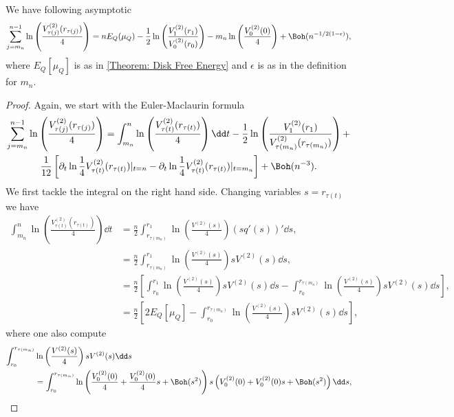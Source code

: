 \begin{proposicao}	\label{Proposition: mn-N lnv disk}
	We have following asymptotic
	\begin{equation}
		\sum_{j=m_n}^{n-1}\ln \left( \frac{V^{(2)}_{\tau(j)}(r_{\tau(j)})}{4}\right) = n E_Q(\mu_Q)  - \frac{1}{2} \ln \left( \frac{V^{(2)}_{1}(r_1)}{V^{(2)}_{0}(r_{0})} \right)  - m_n \ln\left(  \frac{V^{(2)}_0(0)}{4} \right) + \Boh(n^{-1/2(1-\epsilon)}),
	\end{equation}
	where $E_Q[\mu_Q]$ is as in \autoref{Theorem: Disk Free Energy} and $\epsilon$ is as in the definition for $m_n$.
\end{proposicao}
\begin{proof}
	Again, we start with the Euler-Maclaurin formula
		\begin{multline}
		\sum_{j=m_n}^{n-1} \ln \left( \frac{V^{(2)}_{\tau(j)}(r_{\tau(j)})}{4}\right) = \int_{m_n}^{n} \ln \left( \frac{V^{(2)}_{\tau(t)}(r_{\tau(t)})}{4}\right)  \dd t - \frac{1}{2} \ln \left( \frac{V^{(2)}_{1}(r_1)}{V^{(2)}_{\tau(m_n)}(r_{\tau(m_n)})} \right) + \\ \frac{1}{12} \left[ \partial_t \ln \frac{1}{4} V^{(2)}_{\tau(t)}(r_{\tau(t)}) |_{t=n} - \partial_t \ln \frac{1}{4} V^{(2)}_{\tau(t)}(r_{\tau(t)}) |_{t=m_n}\right]  + \Boh(n^{-3}).
	\end{multline}
	We first tackle the integral on the right hand side. Changing variables $s = r_{\tau(t)}$ we have
	\begin{align}
		\int_{m_n}^{n} \ln \left( \frac{V^{(2)}_{\tau(t)}(r_{\tau(t)})}{4}\right)  \dd t & = \frac{n}{2} \int_{r_{\tau(m_n)}}^{r_1} \ln\left(\frac{V^{(2)}(s)}{4}\right) (sq'(s))' \dd s, \\
		& =  \frac{n}{2} \int_{r_{\tau(m_n)}}^{r_1} \ln\left(\frac{V^{(2)}(s)}{4}\right)  s V^{(2)}(s) \dd s, \\
		& = \frac{n}{2} \left[ \int_{r_0}^{r_1}\ln\left(\frac{V^{(2)}(s)}{4}\right) s V^{(2)}(s) \dd s -  \int_{r_0}^{r_{\tau(m_n)}} \ln\left(\frac{V^{(2)}(s)}{4}\right) s V^{(2)}(s) \dd s  \right], \\
		& = \frac{n}{2} \left[ 2 E_Q[\mu_Q] -  \int_{r_0}^{r_{\tau(m_n)}} \ln\left(\frac{V^{(2)}(s)}{4}\right) s V^{(2)}(s) \dd s  \right], 
	\end{align}
	where one also compute
	\begin{align}
		\int_{r_0}^{r_{\tau(m_n)}} & \ln\left(\frac{V^{(2)}(s)}{4}\right) s V^{(2)}(s) \dd s \\ 
		& = \int_{r_0}^{r_{\tau(m_n)}} \ln\left(\frac{V^{(2)}_0(0)}{4} + \frac{V^{(2)}_0(0)}{4} s + \Boh(s^2) \right) s \left( V^{(2)}_0(0) + V^{(2)}_0(0) s + \Boh(s^2) \right) \dd s, \\

\end{align}
\end{proof}
